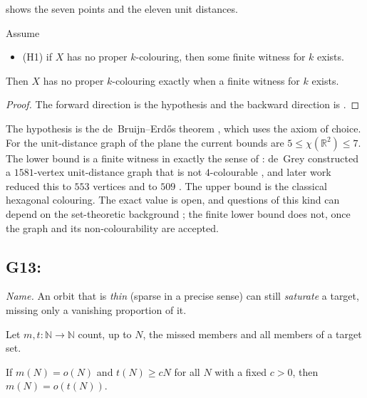  shows the seven points and the eleven unit distances.



\begin{proposition}\label{prop:G12-compact}
Assume
\begin{itemize}
  \item \textup{(H1)} if $X$ has no proper $k$-colouring, then some finite witness for $k$ exists.
\end{itemize}
Then $X$ has no proper $k$-colouring exactly when a finite witness for $k$ exists.
\end{proposition}

\begin{proof}
The forward direction is the hypothesis and the backward direction is .
\end{proof}

The hypothesis is the de~Bruijn--Erd\H{o}s theorem \citep{BruijnErdos1951}, which uses the axiom of
choice. For the unit-distance graph of the plane the current bounds are $5 \le \chi(\mathbb{R}^2)
\le 7$. The lower bound is a finite witness in exactly the sense of : de~Grey
constructed a $1581$-vertex unit-distance graph that is not $4$-colourable \citep{DeGrey2018}, and
later work reduced this to $553$ vertices \citep{Heule2018} and to $509$ \citep{Parts2020}. The
upper bound is the classical hexagonal colouring. The exact value is open, and questions of this
kind can depend on the set-theoretic background \citep{ShelahSoifer2003,Falconer1981}; the finite
lower bound does not, once the graph and its non-colourability are accepted.

\subsection{G13: \lawGThirteen}\label{sec:G13}

\emph{Name.} An orbit that is \emph{thin} (sparse in a precise sense) can still \emph{saturate} a
target, missing only a vanishing proportion of it.

Let $m, t : \mathbb{N} \to \mathbb{N}$ count, up to $N$, the missed members and all members of a
target set.

\begin{theorem}\label{thm:G13-density}
If $m(N) = o(N)$ and $t(N) \ge cN$ for all $N$ with a fixed $c > 0$, then $m(N) = o(t(N))$.
\end{theorem}

